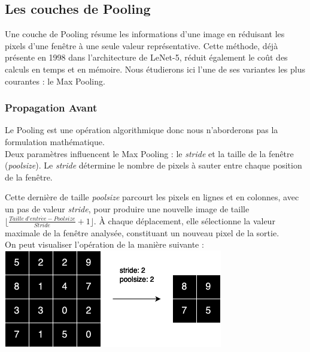 \begin{multicols}{2}
\subsection{Les couches de Pooling}
Une couche de Pooling résume les informations d’une image en réduisant les pixels 
d’une fenêtre à une seule valeur représentative. Cette méthode, déjà présente en 1998 dans l'architecture de 
LeNet-5, réduit également le coût des calculs en temps et en mémoire. Nous étudierons 
ici l’une de ses variantes les plus courantes :  le Max Pooling. 

\subsubsection{Propagation Avant}

Le Pooling est une opération algorithmique donc nous n'aborderons pas
la formulation mathématique.\\

Deux paramètres influencent le Max Pooling : le \textit{stride} et 
la taille de la fenêtre (\textit{poolsize}). Le \textit{stride} détermine 
le nombre de pixels à sauter entre chaque position de la fenêtre.

Cette dernière de taille \textit{poolsize} parcourt les pixels en lignes 
et en colonnes, avec un pas de valeur \textit{stride}, pour produire une nouvelle 
image de taille $\lfloor \frac{Taille \ d’entr \acute{e}e - Poolsize}{Stride} + 1 \rfloor$. 
À chaque déplacement, elle sélectionne la valeur maximale de la fenêtre 
analysée, constituant un nouveau pixel de la sortie.\\

On peut visualiser l'opération de la manière suivante : \\

\includegraphics[width=\columnwidth]{images/forwardpooling.png}
\hfill\break


\end{multicols}
